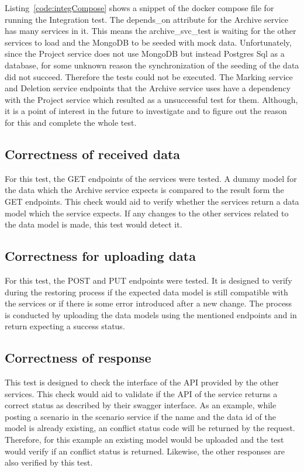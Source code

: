 Listing~\ref{code:integCompose} shows a snippet of the docker compose file for running the Integration test. The depends\_on attribute for the Archive service
has many services in it. This means the archive\_svc\_test is waiting for the other services to load and the MongoDB to be seeded with mock data. Unfortunately,
since the Project service does not use MongoDB but instead Postgres Sql as a database, for some unknown reason the synchronization of the seeding of the data
did not succeed. Therefore the tests could not be executed. The
Marking service and Deletion service endpoints that the Archive service uses have a dependency with the Project service  which resulted as a unsuccessful test
for them. Although, it is a point of interest in the future to investigate and to figure out the reason for this and complete the whole test.

\subsection{Correctness of received data}
For this test, the GET endpoints of the services were tested. A dummy model for the data which the Archive service expects is compared to the result
form the GET endpoints. This check would aid to verify whether the services return a data model which the service expects. If any changes to the other services
related to the data model is made, this test would detect it. 

\subsection{Correctness for uploading data}
For this test, the POST and PUT endpoints were tested. It is designed to verify during the restoring process if the expected data model 
is still compatible with the services or if there is some error introduced after a new change. The process is conducted by uploading the 
data models using the mentioned endpoints and in return expecting a success status.

\subsection{Correctness of response}
This test is designed to check the interface of the API provided by the other services. This check would aid to validate if the API of the
service returns a correct status as described by their swagger interface. As an example, while posting a scenario in the scenario service if the
name and the data id of the model is already existing, an conflict status code will be returned by the request. Therefore, for this example an existing
model would be uploaded and the test would verify if an conflict status is returned. Likewise, the other responses are also verified by this test. 

